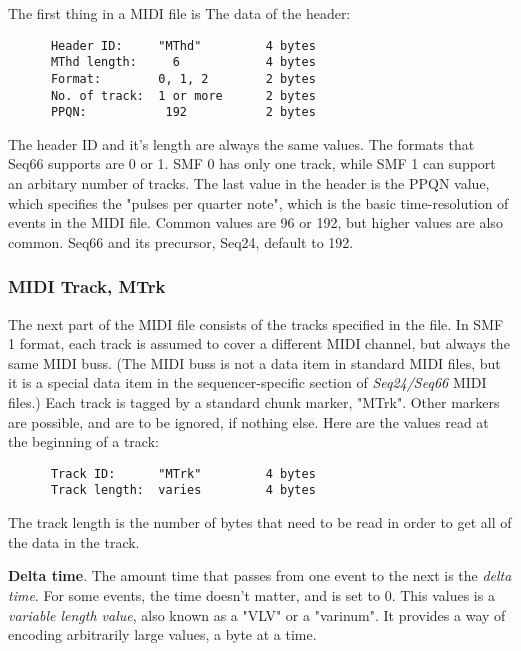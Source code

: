    The first thing in a MIDI file is The data of the header:

   \begin{verbatim}
      Header ID:     "MThd"         4 bytes
      MThd length:     6            4 bytes
      Format:        0, 1, 2        2 bytes
      No. of track:  1 or more      2 bytes
      PPQN:           192           2 bytes
   \end{verbatim}

   The header ID and it's length are always the same values.  The formats that
   Seq66 supports are 0 or 1.  SMF 0 has only one track, while SMF 1 can
   support an arbitary number of tracks.  The last value in the header is the
   PPQN value, which specifies the "pulses per quarter note", which is the
   basic time-resolution of events in the MIDI file.  Common values are 96 or
   192, but higher values are also common.  Seq66 and its precursor,
   Seq24, default to 192.

\subsubsection{MIDI Track, MTrk}
\label{subsubsec:midi_format_track}

   The next part of the MIDI file consists of the tracks specified in the file.
   In SMF 1 format, each track is assumed to cover a different MIDI channel,
   but always the same MIDI buss.  (The MIDI buss is not a data item in
   standard MIDI files, but it is a special data item in the sequencer-specific
   section of \textsl{Seq24/Seq66} MIDI files.)  Each track is tagged by
   a standard chunk marker, "MTrk".  Other markers are possible, and are to be
   ignored, if nothing else.  Here are the values read at the beginning of a
   track:

   \begin{verbatim}
      Track ID:      "MTrk"         4 bytes
      Track length:  varies         4 bytes
   \end{verbatim}

   The track length is the number of bytes that need to be read in order to get
   all of the data in the track.

   \textbf{Delta time}.
   The amount time that passes from one event to the next is the
   \textsl{delta time}.
   For some events, the time doesn't matter, and is set to 0.
   This values is a
   \textsl{variable length value}, also known as a "VLV" or a "varinum".   It
   provides a way of encoding arbitrarily large values, a byte at a time.

